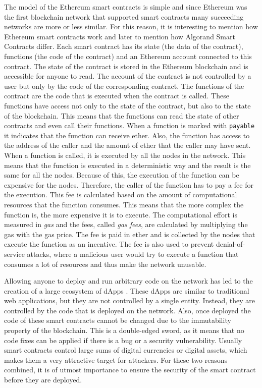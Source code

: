 The model of the Ethereum smart contracts is simple and since Ethereum was the first blockchain network that supported smart contracts many succeeding networks are more or less similar. For this reason, it is interesting to mention how Ethereum smart contracts work and later to mention how Algorand Smart Contracts differ. Each smart contract has its state (the data of the contract), functions (the code of the contract) and an Ethereum account connected to this contract. The state of the contract is stored in the Ethereum blockchain and is accessible for anyone to read. The account of the contract is not controlled by a user but only by the code of the corresponding contract. The functions of the contract are the code that is executed when the contract is called. These functions have access not only to the state of the contract, but also to the state of the blockchain. This means that the functions can read the state of other contracts and even call their functions.
When a function is marked with \texttt{payable} it indicates that the function can receive ether.
Also, the function has access to the address of the caller and the amount of ether that the caller may have sent. When a function is called, it is executed by all the nodes in the network. This means that the function is executed in a deterministic way and the result is the same for all the nodes. Because of this, the execution of the function can be expensive for the nodes.
Therefore, the caller of the function has to pay a fee for the execution. This fee is calculated based on the amount of computational resources that the function consumes. This means that the more complex the function is, the more expensive it is to execute.
The computational effort is measured in \emph{gas} and the fees, called \emph{gas fees}, are calculated by multiplying the gas with the gas price.
The fee is paid in ether and is collected by the nodes that execute the function as an incentive. The fee is also used to prevent denial-of-service attacks, where a malicious user would try to execute a function that consumes a lot of resources and thus make the network unusable.

Allowing anyone to deploy and run arbitrary code on the network has led to the creation of a large ecosystem of \acp{dApp} \cite{wu_empirical_2019}. These \acp{dApp} are similar to traditional web applications, but they are not controlled by a single entity. Instead, they are controlled by the code that is deployed on the network. Also, once deployed the code of these smart contracts cannot be changed due to the immutability property of the blockchain. This is a double-edged sword, as it means that no code fixes can be applied if there is a bug or a security vulnerability. Usually smart contracts control large sums of digital currencies or digital assets, which makes them a very attractive target for attackers. For these two reasons combined, it is of utmost importance to ensure the security of the smart contract before they are deployed.


